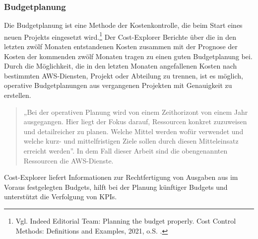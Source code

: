 \newpage
\subsubsection*{Budgetplanung}
Die Budgetplanung ist eine Methode der Kostenkontrolle, die beim Start eines neuen Projekts eingesetzt wird.\footnote{Vgl. Indeed Editorial Team: Planning the budget properly. Cost Control Methods: Definitions and Examples, 2021, o.S. \cite{BUD2}.} Der Cost-Explorer Berichte über die in den letzten zwölf Monaten entstandenen Kosten zusammen mit der Prognose der Kosten der kommenden zwölf Monaten tragen zu einen guten Budgetplanung bei.
Durch die Möglichkeit, die in den letzten Monaten angefallenen Kosten nach bestimmten AWS-Diensten, Projekt oder Abteilung zu trennen, ist es möglich, operative Budgetplanungen aus vergangenen Projekten mit Genauigkeit zu erstellen. 
\begin{quote}
  „Bei der operativen Planung wird von einem Zeithorizont von einem Jahr ausgegangen. Hier liegt der Fokus darauf, Ressourcen konkret zuzuweisen und detailreicher zu planen. Welche Mittel werden wofür verwendet und welche kurz- und mittelfristigen Ziele sollen durch diesen Mitteleinsatz erreicht werden”\cite{BUD1}.
  In dem Fall dieser Arbeit sind die obengenannten Ressourcen die AWS-Dienste.
\end{quote}
Cost-Explorer liefert Informationen zur Rechtfertigung von Ausgaben aus im Voraus festgelegten Budgets, hilft bei der Planung künftiger Budgets und unterstützt die Verfolgung von KPIs.
